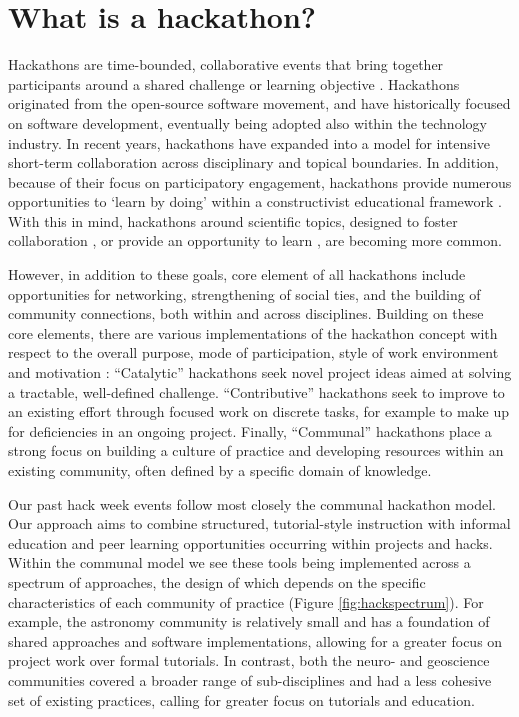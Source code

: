 \section*{What is a hackathon?}

Hackathons are time-bounded, collaborative events that bring together participants around a shared challenge or learning objective \cite{Decker2015}.
Hackathons originated from the open-source software movement, and have historically focused on software development, eventually being adopted also within the technology industry.
In recent years, hackathons have expanded into a model for intensive short-term collaboration across disciplinary and topical boundaries.
In addition, because of their focus on participatory engagement, hackathons provide numerous opportunities to `learn by doing' within a constructivist educational framework \cite{Bransford2000-lu,Papert1980-fh}.
With this in mind, hackathons around scientific topics, designed to foster collaboration \cite{Groen2015-cj,Moller2013-ah}, or provide an opportunity to learn \cite{Kienzler2015-zu,Lamers2014-xf}, are becoming more common.

However, in addition to these goals, core element of all hackathons include opportunities for networking, strengthening of social ties, and the building of community connections, both within and across disciplines.
Building on these core elements, there are various implementations of the hackathon concept with respect to the overall purpose, mode of participation, style of work environment and motivation \cite{Drouhard2017}:
``Catalytic'' hackathons seek novel project ideas aimed at solving a tractable, well-defined challenge.
``Contributive'' hackathons seek to improve to an existing effort through focused work on discrete tasks, for example to make up for deficiencies in an ongoing project.
Finally, ``Communal'' hackathons place a strong focus on building a culture of practice and developing resources within an existing community, often defined by a specific domain of knowledge.

Our past hack week events follow most closely the communal hackathon model.
Our approach aims to combine structured, tutorial-style instruction with informal education and peer learning opportunities occurring within projects and hacks.
Within the communal model we see these tools being implemented across a spectrum of approaches, the design of which depends on the specific characteristics of each community of practice (Figure \ref{fig:hackspectrum}).
For example, the astronomy community is relatively small and has a foundation of shared approaches and software implementations, allowing for a greater focus on project work over formal tutorials.
In contrast, both the neuro- and geoscience communities covered a broader range of sub-disciplines and had a less cohesive set of existing practices, calling for greater focus on tutorials and education.


